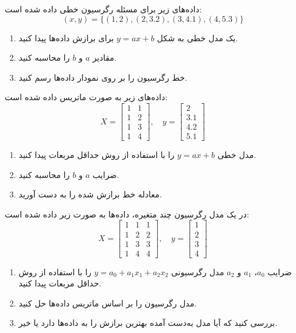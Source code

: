\begin{exercise}
	داده‌های زیر برای مسئله رگرسیون خطی داده شده است:
	\[
	(x, y) = \{(1, 2), (2, 3.2), (3, 4.1), (4, 5.3)\}
	\]
	\begin{enumerate}
		\item یک مدل خطی به شکل \(y = ax + b\) برای برازش داده‌ها پیدا کنید.
		\item مقادیر \(a\) و \(b\) را محاسبه کنید.
		\item خط رگرسیون را بر روی نمودار داده‌ها رسم کنید.
	\end{enumerate}
\end{exercise}

\begin{exercise}
	داده‌های زیر به صورت ماتریس داده شده است:
	\[
	X = \begin{bmatrix}
		1 & 1 \\
		1 & 2 \\
		1 & 3 \\
		1 & 4
	\end{bmatrix}, \quad
	y = \begin{bmatrix}
		2 \\
		3.1 \\
		4.2 \\
		5.1
	\end{bmatrix}
	\]
	\begin{enumerate}
		\item مدل خطی \(y = ax + b\) را با استفاده از روش حداقل مربعات پیدا کنید.
		\item ضرایب \(a\) و \(b\) را محاسبه کنید.
		\item معادله خط برازش شده را به دست آورید.
	\end{enumerate}
	
\end{exercise}
\begin{exercise}
	در یک مدل رگرسیون چند متغیره، داده‌ها به صورت زیر داده شده است:
	\[
	X = \begin{bmatrix}
		1 & 1 & 1 \\
		1 & 2 & 2 \\
		1 & 3 & 3 \\
		1 & 4 & 4
	\end{bmatrix}, \quad
	y = \begin{bmatrix}
		1 \\
		2 \\
		3 \\
		4
	\end{bmatrix}
	\]
	\begin{enumerate}
		\item ضرایب \(a_0\)، \(a_1\) و \(a_2\) مدل رگرسیونی \(y = a_0 + a_1 x_1 + a_2 x_2\) را با استفاده از روش حداقل مربعات پیدا کنید.
		\item مدل رگرسیون را بر اساس ماتریس داده‌ها حل کنید.
		\item بررسی کنید که آیا مدل به‌دست آمده بهترین برازش را به داده‌ها دارد یا خیر.
	\end{enumerate}
\end{exercise}
